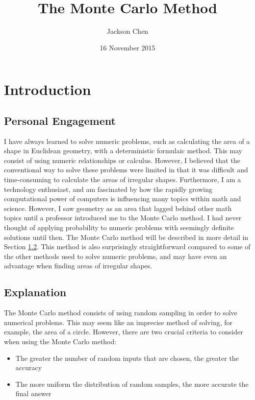 \documentclass[10pt, letterpaper]{article}
\newcommand{\subtitle}[1]{
  \posttitle{
    \par\end{center}
    \begin{center}\large#1\end{center}
    \vskip0.5em}
}
\begin{document}
  \title{The Monte Carlo Method}
  \subtitle {IB Math HL Period 5, Dr. Silverman}
  \date{16 November 2015}
  \author{Jackson Chen}
  \maketitle

  \section{Introduction}

  \subsection{Personal Engagement}

  I have always learned to solve numeric problems, such as calculating the area of a shape in Euclidean geometry,
  with a deterministic formulaic method. This may consist of using numeric relationships or calculus. However, I believed that
  the conventional way to solve these problems were limited in that it was difficult and time-consuming to calculate the areas
  of irregular shapes. Furthermore, I am a technology enthusiast, and am fascinated by how the rapidly growing computational power
  of computers is influencing many topics within math and science. However, I saw geometry as an area that lagged behind other math topics
  until a professor introduced me to the Monte Carlo method. I had never thought of applying probability to numeric problems
  with seemingly definite solutions until then. The Monte Carlo method will be described in more detail in Section \ref{subsec:explanation}.
  This method is also surprisingly straightforward compared to some of
  the other methods used to solve numeric problems, and may have even an advantage when finding areas of irregular shapes.

  \subsection{Explanation} \label{subsec:explanation}

  The Monte Carlo method consists of using random sampling in order to solve numerical problems. This may seem like an imprecise method
  of solving, for example, the area of a circle. However, there are two crucial criteria to consider when using the Monte Carlo method:
  \begin{itemize}
    \item The greater the number of random inputs that are chosen, the greater the accuracy
    \item The more uniform the distribution of random samples, the more accurate the final answer
  \end{itemize}
\end{document}
